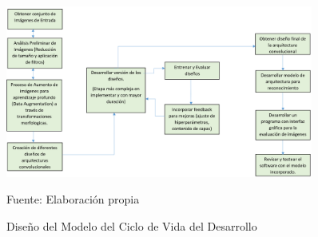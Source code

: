 			\begin{figure}[H]
			\begin{center}
			\includegraphics[width=0.9\textwidth]{images/intro/disenho}
			\end{center}
			\begin{center}
			\vskip 0.6cm	
			\caption{\small{Diseño del Modelo del Ciclo de Vida del Desarrollo}}
			{\small{Fuente: Elaboración propia}}
			\end{center}
			\vspace{-1.5em}
			\end{figure}





	